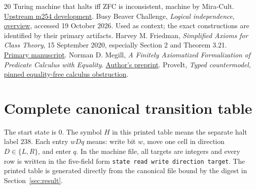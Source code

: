 \documentclass[11pt]{article}
\theoremstyle{definition}\newtheorem{definition}[theorem]{Definition}
\begin{document}
\begin{thebibliography}{20}
{Turing machine that halts iff ZFC is inconsistent}, machine by Mira-Cult.
\href{https://github.com/jeff87654/busy-beaver/tree/zf-254/ZF/m254}{Upstream m254 development}.
 Busy Beaver Challenge, \emph{Logical independence},
\href{https://wiki.bbchallenge.org/wiki/Logical_independence}{overview},
accessed 19 October 2026.  Used as context; the exact constructions are
identified by their primary artifacts.
 Harvey M. Friedman, \emph{Simplified Axioms for Class
Theory}, 15 September 2020, especially Section 2 and Theorem 3.21.
\href{https://bpb-us-w2.wpmucdn.com/u.osu.edu/dist/1/1952/files/2020/09/NBGAxioms091520.pdf}{Primary manuscript}.
 Norman D. Megill, \emph{A Finitely Axiomatized
Formalization of Predicate Calculus with Equality}.
\href{https://us.metamath.org/downloads/finiteaxiom.pdf}{Author's preprint}.
 ProveIt, \emph{Typed countermodel},
\href{https://github.com/VladimirReshetnikov/ProveIt/blob/ce192939372ac7944fe2a0208c68a96d49fb5e3b/Computability/BusyBeaver/Research/ZFC/typed_countermodel.md}{pinned equality-free calculus obstruction}.
\end{thebibliography}

\clearpage
\appendix
\section{Complete canonical transition table}
\label{app:table}
The start state is $0$.  The symbol $H$ in this printed table means the
separate halt label $238$.  Each entry $wDq$ means: write bit $w$, move
one cell in direction $D\in\{L,R\}$, and enter $q$.  In the machine file,
all targets are integers and every row is written in the five-field form
\texttt{state read write direction target}.  The printed table is generated
directly from the canonical file bound by the digest in Section~\ref{sec:result}.

\end{document}
